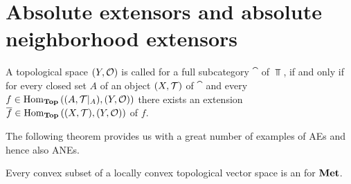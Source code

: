 \section{Absolute extensors and absolute neighborhood extensors}

\begin{definition}
	A topological space $\tspace[Y][O]$ is called \textit{\aex} for a full subcategory $\cat$ of $\Top$, if and only if for every closed set $A$ of an object $\tspace$ of $\cat$ and every $f \in \Hom_\Top\pbraces{\reltspace, \tspace[Y][O]}$ there exists an extension $\overline{f} \in \Hom_\Top\pbraces{\tspace, \tspace[Y][O]}$ of $f$.  
\end{definition}

The following theorem provides us with a great number of examples of AEs and hence also ANEs. 

\begin{theorem}
	Every convex subset of a locally convex topological vector space is an \aex for $\mathbf{Met}$.
\end{theorem}

